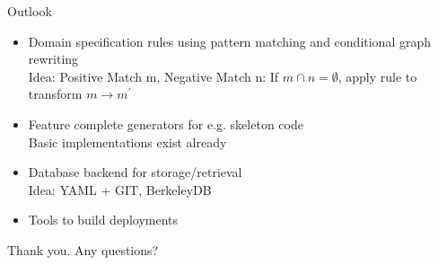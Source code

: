 \documentclass[pdf]
{beamer}
\begin{document}
\begin{frame}{Outlook}
    \begin{itemize}
    \item Domain specification rules using pattern matching and conditional graph rewriting\\
          Idea: Positive Match m, Negative Match n: If $m \cap n = \emptyset$, apply rule to transform $m \to m^{'}$
    \item Feature complete generators for e.g. skeleton code\\
          Basic implementations exist already
    \item Database backend for storage/retrieval\\
          Idea: YAML + GIT, BerkeleyDB
    \item Tools to build deployments
    \end{itemize}
\end{frame}

\begin{frame}[plain]
    \begin{center}
        \huge
        Thank you. Any questions?
    \end{center}
\end{frame}
\end{document}
